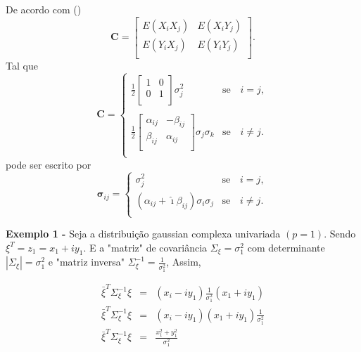 De acordo com (\cite{good})
\begin{equation}
\mathbf{C} = \left[
\begin{array}{cc}
	E(X_iX_j)  & E(X_iY_j)  \\
	E(Y_iX_j)  & E(Y_iY_j)  \\
\end{array}
\right].
\end{equation}
Tal que
\begin{equation}
\mathbf{C} =
\left\{
\begin{array}{cc}
	\frac{1}{2}\left[
\begin{array}{cc}
	 1 & 0  \\
	 0 & 1  \\
\end{array}
	\right]\sigma^{2}_{j}  & \mbox{se}\quad i=j, \\
	& \\
	\frac{1}{2}\left[
\begin{array}{cc}
	\alpha_{ij} & -\beta_{ij}  \\
	 \beta_{ij} & \alpha_{ij}  \\
\end{array}
	\right]\sigma_j\sigma_k  & \mbox{se}\quad i\neq j.   \\
\end{array}
\right.
\end{equation}
pode ser escrito por
\begin{equation}
\mathbf{\sigma}_{ij} =
\left\{
\begin{array}{cc}
	\sigma^{2}_{j}  & \mbox{se}\quad i=j, \\
	(\alpha_{ij}+\hat{\imath}\beta_{ij})\sigma_i\sigma_j  & \mbox{se}\quad i\neq j.   \\
\end{array}
\right.
\end{equation}

{\bf Exemplo 1 -} Seja a distribuição gaussian complexa univariada $(p=1)$. Sendo $\xi^{T}=z_1=x_1+iy_1$. E a "matriz" de covariância $\Sigma_{\xi}=\sigma_{1}^{2}$ com determinante $|\Sigma_{\xi}|=\sigma_{1}^{2}$ e  "matriz inversa" $\Sigma_{\xi}^{-1}=\frac{1}{\sigma_{1}^{2}}$, Assim,

\begin{equation}\label{eqn70}
\begin{array}{ccc}
	\bar{\xi}^{T}\Sigma_{\xi}^{-1}\xi&=&(x_i-iy_1)\frac{1}{\sigma_1^2}(x_1+iy_1)  \\
	\bar{\xi}^{T}\Sigma_{\xi}^{-1}\xi&=&(x_i-iy_1)(x_1+iy_1)\frac{1}{\sigma_1^2}  \\
	\bar{\xi}^{T}\Sigma_{\xi}^{-1}\xi&=&\frac{x_1^2+y_1^2}{\sigma_1^2}  \\
\end{array}
\end{equation}


